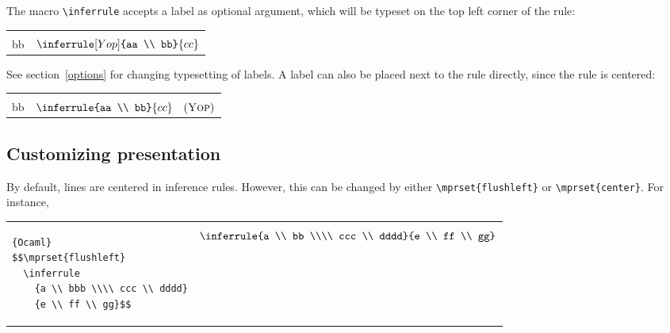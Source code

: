 \documentclass {article}
\let \lst \verb
\begin{document}
The macro \lst"\inferrule" accepts a label as optional argument, which will
be typeset on the top left corner of the rule:
\par
\begin{tabular}{m{0.54\hsize}m{0.3\hsize}}
\begin{lstlisting}{Ocaml}
\inferrule [yop]
   {aa \\ bb}
   {cc}
\end{lstlisting}
&
$\inferrule [Yop]{aa \\ bb}{cc}$
\\
\end{tabular}
\par\noindent
See section~\ref {options} for changing typesetting of labels.
A label can also be placed next to the rule directly, since the rule is
centered:
\par
\begin{tabular}{m{0.54\hsize}m{0.3\hsize}}
\begin{lstlisting}{Ocaml}
\inferrule
   {aa \\ bb}
   {cc}
\quad (\textsc {Yop})
\end{lstlisting}
&
$\inferrule{aa \\ bb}{cc} \quad (\textsc {Yop})$
\\
\end{tabular}

\subsection {Customizing presentation}

By default, lines are centered in inference rules.
However, this can be changed by either \lst"\mprset{flushleft}"
or \lst"\mprset{center}". For instance,

\begin{tabular}{m{0.44\hsize}m{0.44\hsize}}
\begin{lstlisting}{Ocaml}
$$\mprset{flushleft}
  \inferrule
    {a \\ bbb \\\\ ccc \\ dddd}
    {e \\ ff \\ gg}$$
\end{lstlisting}
&
$$%
\hsize 0.45\hsize
\inferrule {a \\ bb  \\\\
         ccc \\ dddd}{e \\ ff \\ gg}$$
\\
\end{tabular}
\end{document}
